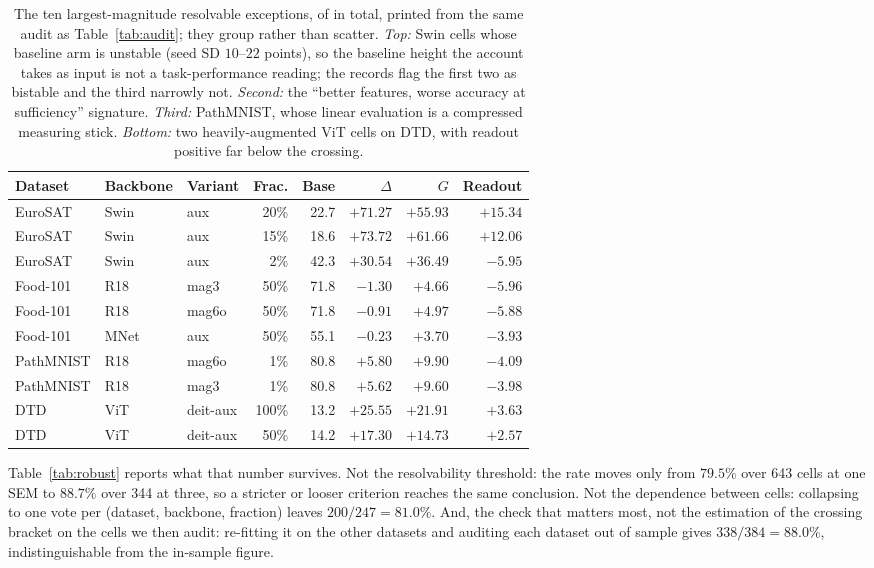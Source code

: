 \begin{table}[pos=htbp]
\caption{The ten largest-magnitude resolvable exceptions, of
\auditWrong{} in total, printed from the same audit as
Table~\ref{tab:audit}; they group rather than scatter. \emph{Top:} Swin cells
whose baseline arm is unstable (seed SD $10$--$22$ points), so the baseline
height the account takes as input is not a task-performance reading; the
records flag the first two as bistable and the third narrowly not.
\emph{Second:} the ``better features, worse accuracy at sufficiency''
signature. \emph{Third:} PathMNIST, whose linear evaluation is a compressed
measuring stick. \emph{Bottom:} two heavily-augmented ViT cells on DTD, with
readout positive far below the crossing.}
\label{tab:exceptions}
\centering\scriptsize
\setlength{\tabcolsep}{2.3pt}
\begin{tabular}{lllrrrrr}
\toprule
Dataset & Backbone & Variant & Frac. & Base & $\Delta$ & $G$ & Readout \\
\midrule
EuroSAT & Swin & aux & 20\% & 22.7 & $+71.27$ & $+55.93$ & $+15.34$ \\
EuroSAT & Swin & aux & 15\% & 18.6 & $+73.72$ & $+61.66$ & $+12.06$ \\
EuroSAT & Swin & aux & 2\%  & 42.3 & $+30.54$ & $+36.49$ & $-5.95$ \\
\midrule
Food-101 & R18 & mag3 & 50\% & 71.8 & $-1.30$ & $+4.66$ & $-5.96$ \\
Food-101 & R18 & mag6o & 50\% & 71.8 & $-0.91$ & $+4.97$ & $-5.88$ \\
Food-101 & MNet & aux & 50\% & 55.1 & $-0.23$ & $+3.70$ & $-3.93$ \\
\midrule
PathMNIST & R18 & mag6o & 1\% & 80.8 & $+5.80$ & $+9.90$ & $-4.09$ \\
PathMNIST & R18 & mag3 & 1\% & 80.8 & $+5.62$ & $+9.60$ & $-3.98$ \\
\midrule
DTD & ViT & deit-aux & 100\% & 13.2 & $+25.55$ & $+21.91$ & $+3.63$ \\
DTD & ViT & deit-aux & 50\% & 14.2 & $+17.30$ & $+14.73$ & $+2.57$ \\
\bottomrule
\end{tabular}
\end{table}

Table~\ref{tab:robust} reports what that number survives. Not the
resolvability threshold: the rate moves only from $79.5\%$ over 643 cells at
one SEM to $88.7\%$ over 344 at three, so a stricter or looser criterion
reaches the same conclusion. Not the dependence between cells: collapsing to
one vote per (dataset, backbone, fraction) leaves $200/247 = 81.0\%$. And, the
check that matters most, not the estimation of the crossing bracket on the
cells we then audit: re-fitting it on the other datasets and auditing each
dataset out of sample gives $338/384 = 88.0\%$, indistinguishable from the
in-sample figure.


